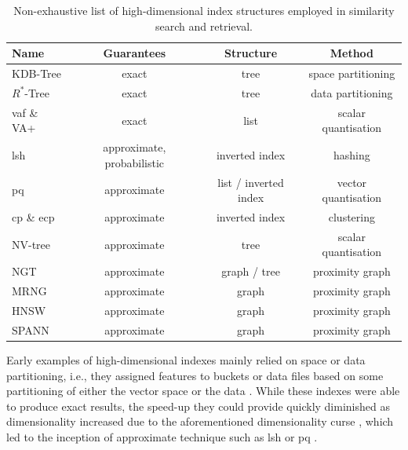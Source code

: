 \begin{table}
    \caption{Non-exhaustive list of high-dimensional index structures employed in similarity search and retrieval.}
    \label{table:index_structures}
    \begin{tabular}{ | l | c | c | c |}
        \hline
        \textbf{Name} & \textbf{Guarantees} & \textbf{Structure} & \textbf{Method} \\
        \hline
        \hline
        KDB-Tree \cite{Robinson:1981KDB} & exact & tree & space partitioning \\  
        \hline
        $R^{*}$-Tree \cite{Beckmann:1990RTree} & exact & tree & data partitioning \\ 
        \hline
        \acrshort{vaf} \& VA+ \cite{Weber:1998Va,Ferhatosmanoglu:2000Vector} & exact & list & scalar quantisation \\ 
        \hline
        \acrshort{lsh} \cite{Indyk1998:Approximate, Wang:2017ASurvey} & approximate, probabilistic & inverted index & hashing \\ 
        \hline
        \acrshort{pq} \cite{Jegou:2010Product} & approximate & list / inverted index & vector quantisation \\
        \hline 
        \acrshort{cp} \& e\acrshort{cp} \cite{Chierichetti:2007Finding,Gudmundsson:2010Large} & approximate & inverted index & clustering \\ 
        \hline
        NV-tree \cite{Lejsek:2009NVTree} & approximate & tree & scalar quantisation \\ 
        \hline
        NGT \cite{Iwasaki2016:Pruned} & approximate & graph / tree & proximity graph \\ 
        \hline
        MRNG \cite{Fu:2017Fast} & approximate & graph & proximity graph \\ 
        \hline
        HNSW \cite{Malkov:2018Efficient} & approximate & graph & proximity graph \\ 
        \hline
        SPANN \cite{Chen:2021SPANN} & approximate & graph & proximity graph \\ 
        \hline
    \end{tabular}
\end{table}

Early examples of high-dimensional indexes mainly relied on space or data partitioning, i.e., they assigned features to buckets or data files based on some partitioning of either the vector space \cite{Bentley:1975Multidimensional,Robinson:1981KDB,Finkel:1974Quad} or the data \cite{Guttmann:1984RTrees,Beckmann:1990RTree,Ciaccia:1997Mtree}. While these indexes were able to produce exact results, the speed-up they could provide quickly diminished as dimensionality increased due to the aforementioned dimensionality curse \cite{Shaft:2006Theory}, which led to the inception of approximate technique such as \acrshort{lsh} \cite{Indyk1998:Approximate} or \acrshort{pq} \cite{Jegou:2010Product}.

